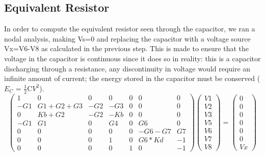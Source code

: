 \subsection{Equivalent Resistor}
In order to compute the equivalent resistor seen through the capacitor, we ran a nodal analysis, making Vs=0 and replacing the capacitor with a voltage source Vx=V6-V8 as calculated in the previous step. This is made to ensure that the voltage in the capacitor is continuous since it does so in reality: this is a capacitor discharging through a resistance, any discontinuity in voltage would require an infinite amount of current; the energy stored in the capacitor must be conserved ($E_{C}$ = \( \frac{1}{2} \)C$V^{2}$).
\begin{equation}
\begin{pmatrix}
1 & 0 & 0 & 0 & 0 & 0 & 0\\
-G1 & G1+G2+G3 & -G2 & -G3 & 0 & 0 & 0\\
0 & Kb+G2 & -G2 & -Kb & 0 & 0 & 0\\
-G1 & G1 & 0 & G4 & 0 & G6 & 0\\
0 & 0 & 0 & 0 & 0 & -G6-G7 & G7\\
0 & 0 & 0 & 1 & 0 & G6*Kd & -1\\
0 & 0 & 0 & 0 & 1 & 0 & -1
\end{pmatrix}
\begin{pmatrix}
V1\\
V2\\
V3\\
V5\\
V6\\
V7\\
V8
\end{pmatrix}
=
\begin{pmatrix}
0\\
0\\
0\\
0\\
0\\
0\\
Vx
\end{pmatrix}
\end{equation}

